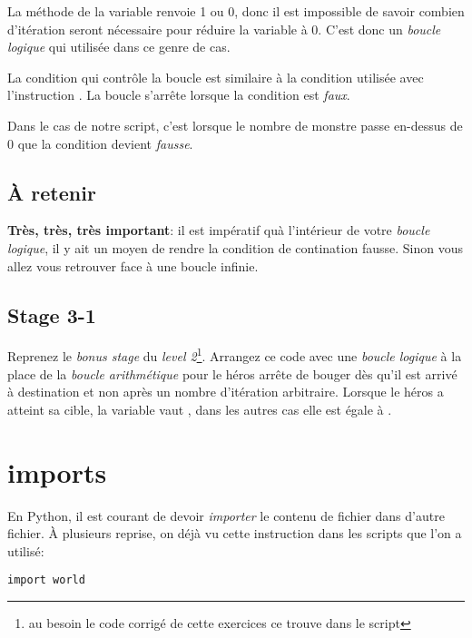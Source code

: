 La méthode  de la variable  renvoie 1 ou 0, donc il est impossible de savoir combien d'itération seront nécessaire pour réduire la variable  à 0.
C'est donc un \emph{boucle logique} qui utilisée dans ce genre de cas.

La condition qui contrôle la boucle est similaire à la condition utilisée avec l'instruction .
La boucle s'arrête lorsque la condition est \emph{faux}.

Dans le cas de notre script, c'est lorsque le nombre de monstre passe en-dessus de 0 que la condition devient \emph{fausse}.

\subsection{\`A retenir}

\textbf{Très, très, très important}: il est impératif quà l'intérieur de votre \emph{boucle logique}, il y ait un moyen de rendre la condition de contination fausse. Sinon vous allez vous retrouver face à une boucle infinie. 

\subsection{Stage 3-1}

Reprenez le \textit{bonus stage} du \textit{level 2}\footnote{au besoin le code corrigé de cette exercices ce trouve dans le script }. Arrangez ce code avec une \emph{boucle logique} à la place de la \emph{boucle arithmétique} pour le héros arrête de bouger dès qu'il est arrivé à destination et non après un nombre d'itération arbitraire.
Lorsque le héros a atteint sa cible, la variable  vaut , dans les autres cas elle est égale à .

\section{imports}

En Python, il est courant de devoir \emph{importer} le contenu de fichier dans d'autre fichier.
\`A plusieurs reprise, on déjà vu cette instruction dans les scripts que l'on a utilisé:

\begin{lstlisting}
import world
\end{lstlisting}

